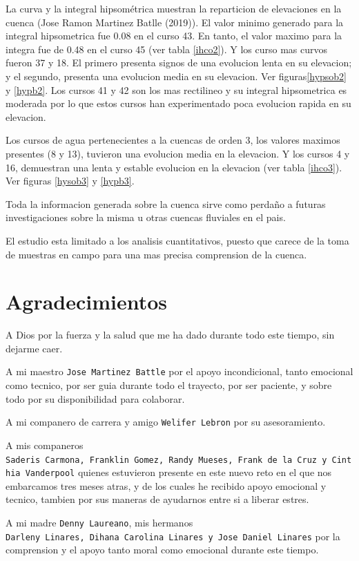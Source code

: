 \documentclass[11pt,]{article}
\begin{document}
La curva y la integral hipsométrica muestran la reparticion de
elevaciones en la cuenca (Jose Ramon Martinez Batlle (2019)). El valor
minimo generado para la integral hipsometrica fue 0.08 en el curso 43.
En tanto, el valor maximo para la integra fue de 0.48 en el curso 45
(ver tabla \ref{ihco2}). Y los curso mas curvos fueron 37 y 18. El
primero presenta signos de una evolucion lenta en su elevacion; y el
segundo, presenta una evolucion media en su elevacion. Ver
figuras\ref{hypsob2} y \ref{hypb2}. Los cursos 41 y 42 son los mas
rectilineo y su integral hipsometrica es moderada por lo que estos
cursos han experimentado poca evolucion rapida en su elevacion.

Los cursos de agua pertenecientes a la cuencas de orden 3, los valores
maximos presentes (8 y 13), tuvieron una evolucion media en la
elevacion. Y los cursos 4 y 16, demuestran una lenta y estable evolucion
en la elevacion (ver tabla \ref{ihco3}). Ver figuras \ref{hysob3} y
\ref{hypb3}.

Toda la informacion generada sobre la cuenca sirve como perdaño a
futuras investigaciones sobre la misma u otras cuencas fluviales en el
pais.

El estudio esta limitado a los analisis cuantitativos, puesto que carece
de la toma de muestras en campo para una mas precisa comprension de la
cuenca.

\section{Agradecimientos}\label{agradecimientos}

A Dios por la fuerza y la salud que me ha dado durante todo este tiempo,
sin dejarme caer.

A mi maestro \texttt{Jose\ Martinez\ Battle} por el apoyo incondicional,
tanto emocional como tecnico, por ser guia durante todo el trayecto, por
ser paciente, y sobre todo por su disponibilidad para colaborar.

A mi companero de carrera y amigo \texttt{Welifer\ Lebron} por su
asesoramiento.

A mis companeros
\texttt{Saderis\ Carmona,\ Franklin\ Gomez,\ Randy\ Mueses,\ Frank\ de\ la\ Cruz\ y\ Cinthia\ Vanderpool}
quienes estuvieron presente en este nuevo reto en el que nos embarcamos
tres meses atras, y de los cuales he recibido apoyo emocional y tecnico,
tambien por sus maneras de ayudarnos entre si a liberar estres.

A mi madre \texttt{Denny\ Laureano}, mis hermanos
\texttt{Darleny\ Linares,\ Dihana\ Carolina\ Linares\ y\ Jose\ Daniel\ Linares}
por la comprension y el apoyo tanto moral como emocional durante este
tiempo.
\end{document}
